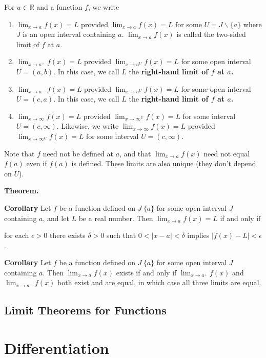 \documentclass[12pt]{article}
\newcommand{\R}{\mathbb{R}}
\begin{document}
For $a \in \R$ and a function $f$, we write \begin{enumerate}
\item $\lim_{x \to a} f(x) = L$ provided $\lim_{x \to a} f(x) = L$ for some $U = J \backslash \{ a \}$ where $J$ is an open interval containing $a$. $\lim_{x \to a} f(x)$ is called the two-sided limit of $f$ at $a$.

\item $\lim_{x \to a^+} f(x) = L$ provided $\lim_{x \to a^U} f(x) = L$ for some open interval $U = (a,b)$. In this case, we call $L$ the \textbf{right-hand limit of $f$ at $a$.}

\item $\lim_{x \to a^-} f(x) = L$ provided $\lim_{x \to a^U} f(x) = L$ for some open interval $U = (c,a)$. In this case, we call $L$ the \textbf{right-hand limit of $f$ at $a$.}

\item $\lim_{x \to \infty} f(x) = L$ provided $\lim_{x \to \infty^U} f(x) = L$ for some interval $U = (c,\infty)$. Likewise, we write $\lim_{x \to \infty} f(x) = L$ provided $\lim_{x \to \infty^U} f(x) = L$ for some interval $U = (c,\infty)$. 

\end{enumerate}  Note that $f$ need not be defined at $a$, and that $\lim_{x \to a} f(x)$ need not equal $f(a)$ even if $f(a)$ is defined. These limits are also unique (they don't depend on $U$).

\textbf{Theorem.}

\textbf{Corollary} Let $f$ be a function defined on $J \ \{ a \}$ for some open interval $J$ containing $a$, and let $L$ be a real number. Then $\lim_{x \to a} f(x) = L$ if and only if \begin{center}
for each $\epsilon > 0$ there exists $\delta > 0$ such that $0 < |x - a| < \delta$ implies $|f(x) - L| < \epsilon$.\end{center}

\textbf{Corollary} Let $f$ be a function defined on $J \ \{ a \}$ for some open interval $J$ containing $a$. Then $\lim_{x \to a} f(x)$ exists if and only if $\lim_{x \to a^+} f(x)$ and $\lim_{x \to a^-} f(x)$ both exist and are equal, in which case all three limits are equal.

\subsection{Limit Theorems for Functions}

\section{Differentiation}
\end{document}
